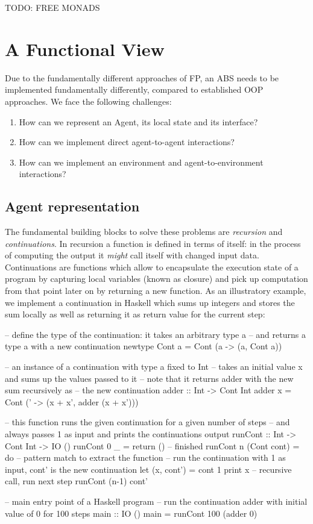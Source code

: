 TODO: FREE MONADS %

\section{A Functional View}
Due to the fundamentally different approaches of FP, an ABS needs to be implemented fundamentally differently, compared to established OOP approaches. We face the following challenges:

\begin{enumerate}
	\item How can we represent an Agent, its local state and its interface?
	\item How can we implement direct agent-to-agent interactions?
	\item How can we implement an environment and agent-to-environment interactions? 
\end{enumerate}

\subsection{Agent representation}
The fundamental building blocks to solve these problems are \textit{recursion} and \textit{continuations}. In recursion a function is defined in terms of itself: in the process of computing the output it \textit{might} call itself with changed input data. Continuations are functions which allow to encapsulate the execution state of a program by capturing local variables (known as closure) and pick up computation from that point later on by returning a new function. As an illustratory example, we implement a continuation in Haskell which sums up integers and stores the sum locally as well as returning it as return value for the current step:

\begin{HaskellCode}
-- define the type of the continuation: it takes an arbitrary type a 
-- and returns a type a with a new continuation
newtype Cont a = Cont (a -> (a, Cont a))

-- an instance of a continuation with type a fixed to Int
-- takes an initial value x and sums up the values passed to it
-- note that it returns adder with the new sum recursively as 
-- the new continuation
adder :: Int -> Cont Int
adder x = Cont (\x' -> (x + x', adder (x + x')))

-- this function runs the given continuation for a given number of steps
-- and always passes 1 as input and prints the continuations output
runCont :: Int -> Cont Int -> IO ()
runCont 0 _ = return () -- finished
runCont n (Cont cont) = do -- pattern match to extract the function
  -- run the continuation with 1 as input, cont' is the new continuation
  let (x, cont') = cont 1
  print x
  -- recursive call, run next step
  runCont (n-1) cont'

-- main entry point of a Haskell program
-- run the continuation adder with initial value of 0 for 100 steps 
main :: IO ()
main = runCont 100 (adder 0)
\end{HaskellCode}

